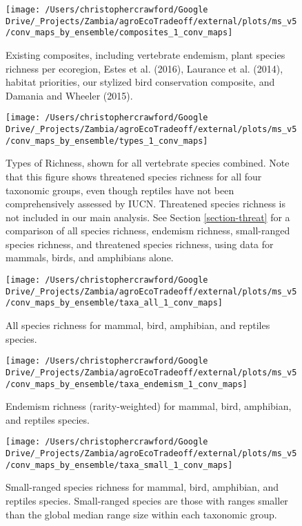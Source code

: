 \documentclass[
]{article}
\begin{document}
\begin{figure}
\texttt{[image: /Users/christophercrawford/Google Drive/\_Projects/Zambia/agroEcoTradeoff/external/plots/ms\_v5/conv\_maps\_by\_ensemble/composites\_1\_conv\_maps]} \caption{Existing composites, including vertebrate endemism, plant species richness per ecoregion, Estes et al. (2016), Laurance et al. (2014), habitat priorities, our stylized bird conservation composite, and Damania and Wheeler (2015).}\label{fig:conv-maps-comp-1}
\end{figure}

\begin{figure}
\texttt{[image: /Users/christophercrawford/Google Drive/\_Projects/Zambia/agroEcoTradeoff/external/plots/ms\_v5/conv\_maps\_by\_ensemble/types\_1\_conv\_maps]} \caption{Types of Richness, shown for all vertebrate species combined. Note that this figure shows threatened species richness for all four taxonomic groups, even though reptiles have not been comprehensively assessed by IUCN. Threatened species richness is not included in our main analysis. See Section \ref{section-threat} for a comparison of all species richness, endemism richness, small-ranged species richness, and threatened species richness, using data for mammals, birds, and amphibians alone.}\label{fig:conv-maps-types-1}
\end{figure}

\begin{figure}
\texttt{[image: /Users/christophercrawford/Google Drive/\_Projects/Zambia/agroEcoTradeoff/external/plots/ms\_v5/conv\_maps\_by\_ensemble/taxa\_all\_1\_conv\_maps]} \caption{All species richness for mammal, bird, amphibian, and reptiles species.}\label{fig:conv-maps-taxa-all-1}
\end{figure}

\begin{figure}
\texttt{[image: /Users/christophercrawford/Google Drive/\_Projects/Zambia/agroEcoTradeoff/external/plots/ms\_v5/conv\_maps\_by\_ensemble/taxa\_endemism\_1\_conv\_maps]} \caption{Endemism richness (rarity-weighted) for mammal, bird, amphibian, and reptiles species.}\label{fig:conv-maps-taxa-endemism-1}
\end{figure}

\begin{figure}
\texttt{[image: /Users/christophercrawford/Google Drive/\_Projects/Zambia/agroEcoTradeoff/external/plots/ms\_v5/conv\_maps\_by\_ensemble/taxa\_small\_1\_conv\_maps]} \caption{Small-ranged species richness for mammal, bird, amphibian, and reptiles species. Small-ranged species are those with ranges smaller than the global median range size within each taxonomic group.}\label{fig:conv-maps-taxa-small-1}
\end{figure}
\end{document}
